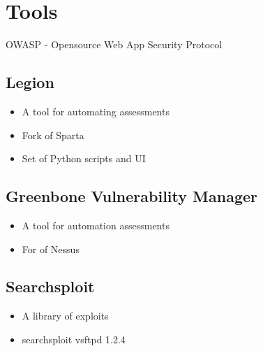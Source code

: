 \section{Tools}
OWASP - Opensource Web App Security Protocol

\subsection{Legion}
\begin{flushleft}
\begin{itemize}
	\item A tool for automating assessments
	\item Fork of Sparta
	\item Set of Python scripts and UI
\end{itemize}
\end{flushleft}

\subsection{Greenbone Vulnerability Manager}
\begin{flushleft}
\begin{itemize}
	\item A tool for automation assessments
	\item For of Nessus
\end{itemize}
\end{flushleft}

\subsection{Searchsploit}
\begin{flushleft}
\begin{itemize}
	\item A library of exploits
	\item searchsploit vsftpd 1.2.4
\end{itemize}
\end{flushleft}
